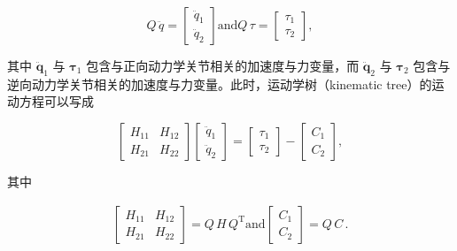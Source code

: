 \documentclass[10pt,a4paper]{book}
\theoremstyle{thmstyle} %
\theoremstyle{defstyle} %
\theoremstyle{prostyle} %
\begin{document}
$$
Q \, \ddot { q } = \left[ \begin{array}{l} { \ddot { q } _ { 1 } } \\{ \ddot { q } _ { 2 } } \end{array} \right]  \mathrm { a n d }  Q \, \tau = \left[ \begin{array}{l} { \tau _ { 1 } } \\{ \tau _ { 2 } } \end{array} \right] ,
$$



其中 $\ddot{\boldsymbol{q}}_{1}$ 与 $\boldsymbol{\tau}_{1}$ 包含与正向动力学关节相关的加速度与力变量，而 $\ddot{\boldsymbol{q}}_{2}$ 与 $\boldsymbol{\tau}_{2}$ 包含与逆向动力学关节相关的加速度与力变量。此时，运动学树（kinematic tree）的运动方程可以写成



$$
\left[ \begin{array}{ll} { H _ { 11 } } & { H _ { 12 } } \\{ H _ { 21 } } & { H _ { 22 } } \end{array} \right] \left[ \begin{array}{l} { \ddot { q } _ { 1 } } \\{ \ddot { q } _ { 2 } } \end{array} \right] = \left[ \begin{array}{l} { \tau _ { 1 } } \\{ \tau _ { 2 } } \end{array} \right] - \left[ \begin{array}{l} { C _ { 1 } } \\{ C _ { 2 } } \end{array} \right] ,
$$



其中



$$
\begin{array}{r} { \left[ \begin{array}{ll} { H _ { 11 } } & { H _ { 12 } } \\{ H _ { 21 } } & { H _ { 22 } } \end{array} \right] = Q \, H \, Q ^{\mathrm { T} }  \mathrm { a n d }  \left[ \begin{array}{l} { C _ { 1 } } \\{ C _ { 2 } } \end{array} \right] = Q \, C \, . } \end{array}
$$
\end{document}
